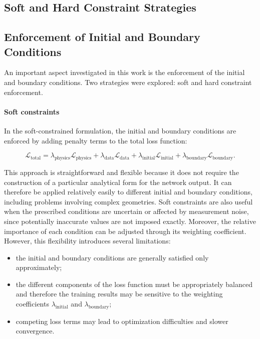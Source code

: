 \subsection{Soft and Hard Constraint Strategies}

\subsection{Enforcement of Initial and Boundary Conditions}

An important aspect investigated in this work is the enforcement of the
initial and boundary conditions. Two strategies were explored: soft and hard
constraint enforcement.

\paragraph{Soft constraints}

In the soft-constrained formulation, the initial and boundary conditions are
enforced by adding penalty terms to the total loss function:

\begin{equation}
\mathcal{L}_{\mathrm{total}}
=
\lambda_{\mathrm{physics}}\mathcal{L}_{\mathrm{physics}}
+
\lambda_{\mathrm{data}}\mathcal{L}_{\mathrm{data}}
+
\lambda_{\mathrm{initial}}\mathcal{L}_{\mathrm{initial}}
+
\lambda_{\mathrm{boundary}}\mathcal{L}_{\mathrm{boundary}}.
\end{equation}

This approach is straightforward and flexible because it does not require the
construction of a particular analytical form for the network output. It can
therefore be applied relatively easily to different initial and boundary
conditions, including problems involving complex geometries. Soft constraints
are also useful when the prescribed conditions are uncertain or affected by
measurement noise, since potentially inaccurate values are not imposed exactly.
Moreover, the relative importance of each condition can be adjusted through its
weighting coefficient. However, this flexibility introduces several limitations:

\begin{itemize}
   \item the initial and boundary conditions are generally satisfied only
    approximately;
    \item the different components of the loss function must be appropriately
    balanced and therefore the training results may be sensitive to the weighting coefficients
    $\lambda_{\mathrm{initial}}$ and $\lambda_{\mathrm{boundary}}$;
    \item competing loss terms may lead to optimization difficulties and slower
    convergence.
\end{itemize}

